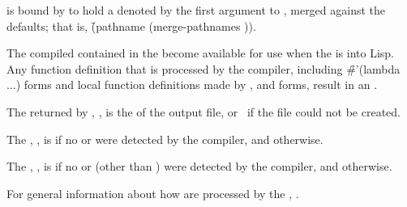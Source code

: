  is bound by 
to hold a  denoted by the first argument to ,
merged against the defaults;
that is, \f{(pathname (merge-pathnames ))}.

The compiled  contained in the  become available
for use when the  is  into Lisp.
Any function definition that is processed by the
compiler, including \f{\#'(lambda ...)} forms and local function
definitions made by ,  and  forms, 
result in an  .  

The  returned by , ,
is the  of the output file, or \nil\ if the file could not be created.  

The , , is 
if no   or 
were detected by the compiler, and  otherwise.

The , , is 
if no   or 
(other than )
were detected by the compiler, and  otherwise.

For general information about how  are processed by the ,
\seesection\FileCompilation.

 
